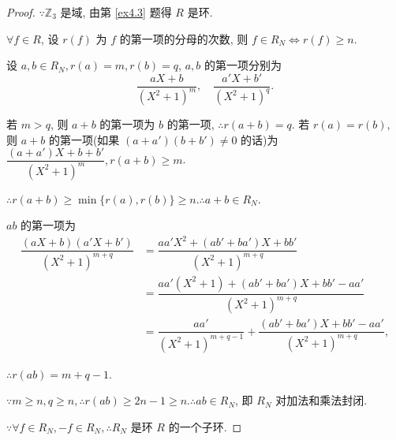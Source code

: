 \documentclass[UTF8]{ctexart}
\begin{document}
\begin{proof}
    $\because\mathbb{Z}_3$ 是域, 由第 \ref{ex4.3} 题得 $R$ 是环.

    $\forall f\in R$, 设 $r(f)$ 为 $f$ 的第一项的分母的次数, 则 $f\in R_N\Leftrightarrow r(f)\geq n$.

    设 $a,b\in R_N,r(a)=m,r(b)=q$, $a,b$ 的第一项分别为
    \[\dfrac{aX+b}{(X^2+1)^m},\quad\dfrac{a'X+b'}{(X^2+1)^q}.\]

    若 $m>q$, 则 $a+b$ 的第一项为 $b$ 的第一项, $\therefore r(a+b)=q$. 若 $r(a)=r(b)$, 
    则 $a+b$ 的第一项(如果 $(a+a')(b+b')\neq0$ 的话)为 $\dfrac{(a+a')X+b+b'}{(X^2+1)^m},r(a+b)\geq m$.

    $\therefore r(a+b)\geq\min\{r(a),r(b)\}\geq n.\therefore a+b\in R_N$.

    $ab$ 的第一项为
    \begin{align*}
        \dfrac{(aX+b)(a'X+b')}{(X^2+1)^{m+q}} & =\dfrac{aa'X^2+(ab'+ba')X+bb'}{(X^2+1)^{m+q}} \\
        & =\dfrac{aa'(X^2+1)+(ab'+ba')X+bb'-aa'}{(X^2+1)^{m+q}} \\
        & =\dfrac{aa'}{(X^2+1)^{m+q-1}}+\dfrac{(ab'+ba')X+bb'-aa'}{(X^2+1)^{m+q}},
    \end{align*}

    $\therefore r(ab)=m+q-1$.

    $\because m\geq n,q\geq n,\therefore r(ab)\geq2n-1\geq n.\therefore ab\in R_N$, 即 $R_N$ 对加法和乘法封闭.

    $\because\forall f\in R_N,-f\in R_N,\therefore R_N$ 是环 $R$ 的一个子环.
\end{proof}
\end{document}
